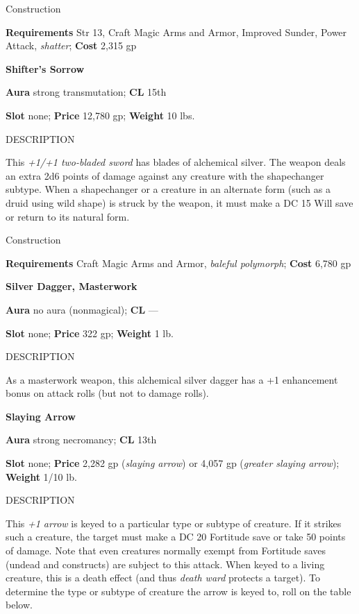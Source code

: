 Construction
				
\textbf{Requirements} Str 13, Craft Magic Arms and Armor, Improved Sunder, Power Attack, \textit{shatter}; \textbf{Cost }2,315 gp
				
\textbf{Shifter's Sorrow}
				
\textbf{Aura} strong transmutation;\textbf{ CL }15th
				
\textbf{Slot} none; \textbf{Price} 12,780 gp; \textbf{Weight} 10 lbs.
				
DESCRIPTION
				
This \textit{+1/+1 two-bladed sword} has blades of alchemical silver. The weapon deals an extra 2d6 points of damage against any creature with the shapechanger subtype. When a shapechanger or a creature in an alternate form (such as a druid using wild shape) is struck by the weapon, it must make a DC 15 Will save or return to its natural form. 
				
Construction
				
\textbf{Requirements} Craft Magic Arms and Armor, \textit{baleful polymorph}; \textbf{Cost }6,780 gp
				
\textbf{Silver Dagger, Masterwork}
				
\textbf{Aura} no aura (nonmagical); \textbf{CL} ---
				
\textbf{Slot} none; \textbf{Price} 322 gp; \textbf{Weight} 1 lb.
				
DESCRIPTION
				
As a masterwork weapon, this alchemical silver dagger has a +1 enhancement bonus on attack rolls (but not to damage rolls).
				
\textbf{Slaying Arrow}
				
\textbf{Aura} strong necromancy;\textbf{ CL }13th
				
\textbf{Slot} none; \textbf{Price} 2,282 gp (\textit{slaying arrow}) or 4,057 gp (\textit{greater slaying arrow}); \textbf{Weight} 1/10 lb.
				
DESCRIPTION
				
This \textit{+1 arrow} is keyed to a particular type or subtype of creature. If it strikes such a creature, the target must make a DC 20 Fortitude save or take 50 points of damage. Note that even creatures normally exempt from Fortitude saves (undead and constructs) are subject to this attack. When keyed to a living creature, this is a death effect (and thus \textit{death ward} protects a target). To determine the type or subtype of creature the arrow is keyed to, roll on the table below.
				
